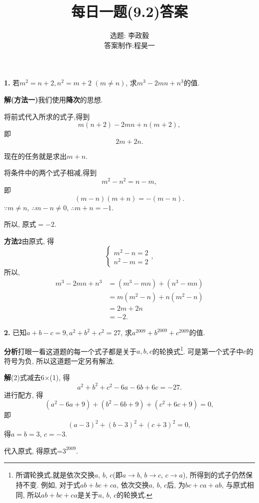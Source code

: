 \documentclass{article}
\title{每日一题(9.2)答案}
\author{\kaishu 选题: 李政毅\\\kaishu 答案制作:程昊一}
\begin{document}
\maketitle
{\kaishu \textbf{1. }若$m^2=n+2, n^2=m+2$ $(m\neq n)$, 求$m^3-2mn+n^3$的值.\\\par}
\textbf{解(方法一)}\quad 我们使用\textbf{降次}的思想.\par
将前式代入所求的式子,得到
\[m(n+2)-2mn+n(m+2),\]
即
\[2m+2n.\]\par
现在的任务就是求出$m+n$.\par
将条件中的两个式子相减,得到
\[m^2-n^2=n-m,\]
即
\[(m-n)(m+n)=-(m-n).\]
$\because m\neq n$, $\therefore m-n\neq 0$, $\therefore m+n=-1.$\par
所以, 原式$=-2$.\par

\textbf{方法2}\quad 由原式, 得
\[\begin{cases}
	m^2-n=2\\n^2-m=2
\end{cases},\]
所以, 
\begin{align*}
	m^3-2mn+n^3&=\left(m^3-mn\right)+\left(n^3-mn\right)\\
	&=m\left(m^2-n\right)+n\left(m^2-n\right)\\
	&=2m+2n\\
	&=-2.
\end{align*}

{\kaishu \textbf{2. }已知$a+b-c=9, a^2+b^2+c^2=27$, 求$a^{2009}+b^{2009}+c^{2009}$的值. }\\\par
\textbf{分析}\quad 打眼一看这道题的每一个式子都是关于$a,b,c$的轮换式\footnote{所谓轮换式,就是依次交换$a$, $b$, $c$(即$a\to b$, $b\to c$, $c\to a$), 所得到的式子仍然保持不变. 例如, 对于式$ab+bc+ca$, 依次交换$a$, $b$, $c$后, 为$bc+ca+ab$, 与原式相同, 所以$ab+bc+ca$是关于$a$, $b$, $c$的轮换式.}. 可是第一个式子中$c$的符号为负, 所以这道题一定另有解法.\par
\textbf{解}\quad (2)式减去6$\times$(1), 得
\[a^2+b^2+c^2-6a-6b+6c=-27.\]
进行配方, 得
\[\left(a^2-6a+9\right)+\left(b^2-6b+9\right)+\left(c^2+6c+9\right)=0,\]
即
\[(a-3)^2+(b-3)^2+(c+3)^2=0,\]
得$a=b=3$, $c=-3$.\par
代入原式, 得原式=$3^2009$.
\end{document}
